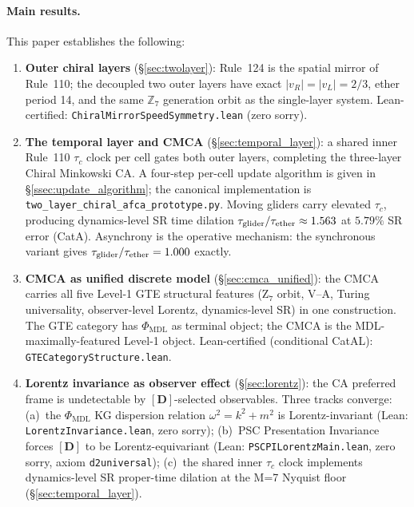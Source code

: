 \documentclass[11pt]{article}
\theoremstyle{remark}
\newcommand{\PHIMDL}{\Phi_{\mathrm{MDL}}}
\newcommand{\ZS}{\mathbb{Z}_7}
\newcommand{\lean}[1]{%
  \penalty-100
  \begingroup\def\_{\textunderscore\allowbreak}\texttt{#1}\endgroup}
\begin{document}
\paragraph{Main results.}
This paper establishes the following:
\begin{enumerate}[noitemsep]
  \item \textbf{Outer chiral layers} (\S\ref{sec:twolayer}):
    Rule~124 is the spatial mirror of Rule~110; the decoupled
    two outer layers have exact $|v_R|=|v_L|=2/3$, ether period 14,
    and the same $\ZS$ generation orbit as the single-layer system.
    Lean-certified: \lean{ChiralMirrorSpeedSymmetry.lean} (zero sorry).

  \item \textbf{The temporal layer and CMCA} (\S\ref{sec:temporal_layer}):
    a shared inner Rule~110 $\tau_c$ clock per cell gates both outer layers,
    completing the three-layer Chiral Minkowski CA.
    A four-step per-cell update algorithm is given in
    \S\ref{ssec:update_algorithm}; the canonical implementation is
    \texttt{two\_layer\_chiral\_afca\_prototype.py}.
    Moving gliders carry elevated $\tau_c$, producing dynamics-level SR time
    dilation $\tau_{\rm glider}/\tau_{\rm ether}\approx1.563$ at $5.79\%$ SR
    error (CatA).  Asynchrony is the operative mechanism: the synchronous
    variant gives $\tau_{\rm glider}/\tau_{\rm ether}=1.000$ exactly.

  \item \textbf{CMCA as unified discrete model} (\S\ref{sec:cmca_unified}):
    the CMCA carries all five Level-1 GTE structural features
    (Z$_7$ orbit, V--A, Turing universality, observer-level Lorentz,
    dynamics-level SR) in one construction.  The GTE category has
    $\PHIMDL$ as terminal object; the CMCA is the MDL-maximally-featured
    Level-1 object.  Lean-certified (conditional CatAL):
    \lean{GTECategoryStructure.lean}.

  \item \textbf{Lorentz invariance as observer effect}
    (\S\ref{sec:lorentz}):
    the CA preferred frame is undetectable by $[\mathbf{D}]$-selected
    observables.  Three tracks converge: (a)~the $\PHIMDL$ KG dispersion
    relation $\omega^2=k^2+m^2$ is Lorentz-invariant (Lean:
    \lean{LorentzInvariance.lean}, zero sorry); (b)~PSC Presentation
    Invariance forces $[\mathbf{D}]$ to be Lorentz-equivariant (Lean:
    \lean{PSCPILorentzMain.lean}, zero sorry, axiom \lean{d2\_universal});
    (c)~the shared inner $\tau_c$ clock implements dynamics-level SR
    proper-time dilation at the M=7 Nyquist floor (\S\ref{sec:temporal_layer}).


\end{enumerate}
\end{document}
